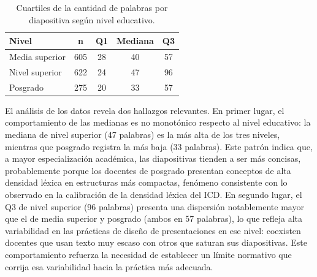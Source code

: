 \documentclass[11pt]{article}
\begin{document}
\begin{table}[H]
    \centering
    \begin{tabular}{|L{3.2cm}|c|c|c|c|}
        \hline
        \textbf{Nivel} & \textbf{n} & \textbf{Q1} & \textbf{Mediana} & \textbf{Q3} \\
        \hline
        Media superior & 605 & 28 & 40 & 57 \\
        \hline
        Nivel superior & 622 & 24 & 47 & 96 \\
        \hline
        Posgrado & 275 & 20 & 33 & 57 \\
        \hline
    \end{tabular}
    \caption{Cuartiles de la cantidad de palabras por diapositiva según nivel educativo.}
    \label{tab:palabras-por-diapositiva-cuartiles}
\end{table}


El análisis de los datos revela dos hallazgos relevantes. En primer lugar, el comportamiento de las medianas es no monotónico respecto al nivel educativo: la mediana de nivel superior (47 palabras) es la más alta de los tres niveles, mientras que posgrado registra la más baja (33 palabras). Este patrón indica que, a mayor especialización académica, las diapositivas tienden a ser más concisas, probablemente porque los docentes de posgrado presentan conceptos de alta densidad léxica en estructuras más compactas, fenómeno consistente con lo observado en la calibración de la densidad léxica del ICD. En segundo lugar, el Q3 de nivel superior (96 palabras) presenta una dispersión notablemente mayor que el de media superior y posgrado (ambos en 57 palabras), lo que refleja alta variabilidad en las prácticas de diseño de presentaciones en ese nivel: coexisten docentes que usan texto muy escaso con otros que saturan sus diapositivas. Este comportamiento refuerza la necesidad de establecer un límite normativo que corrija esa variabilidad hacia la práctica más adecuada.
\end{document}

